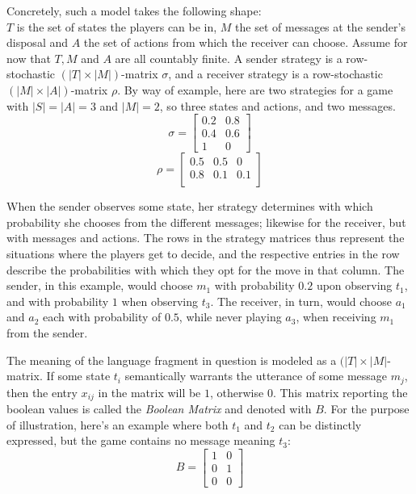 \documentclass[10]{article}
\begin{document}
Concretely, such a model takes the following shape:\\
$T$ is the set of states the players can be in, $M$ the set of messages at the sender's disposal and $A$ the set of actions from which the receiver can choose. Assume for now that $T,M$ and $A$ are all countably finite. A sender strategy is a row-stochastic $(|T| \times |M|)$-matrix $\sigma$, and a receiver strategy is a row-stochastic $(|M|\times |A|)$-matrix $\rho$. By way of example, here are two strategies for a game with $|S|=|A|=3$ and $|M|=2$, so three states and actions, and two messages. \\
\begin{equation*}
\sigma =
\begin{bmatrix}
0.2 & 0.8 \\
0.4 & 0.6 \\
1 & 0
\end{bmatrix}
\end{equation*}
\begin{equation*}
\rho =
\begin{bmatrix}
0.5 & 0.5 & 0\\
0.8 & 0.1 & 0.1 \\
\end{bmatrix}
\end{equation*}%

When the sender observes some state, her strategy determines with which probability she chooses from the different messages; likewise for the receiver, but with messages and actions. The rows in the strategy matrices thus represent the situations where the players get to decide, and the respective entries in the row describe the probabilities with which they opt for the move in that column. The sender, in this example, would choose $m_1$ with probability $0.2$ upon observing $t_1$, and with probability $1$ when observing $t_3$. The receiver, in turn, would choose $a_1$ and $a_2$ each with probability of $0.5$, while never playing $a_3$, when receiving $m_1$ from the sender.

The meaning of the language fragment in question is modeled as a $(|T| \times |M|$-matrix. If some state $t_i$ semantically warrants the utterance of some message $m_j$, then the entry $x_{ij}$ in the matrix will be $1$, otherwise $0$. This matrix reporting the boolean values is called the \textit{Boolean Matrix} and denoted with $B$. For the purpose of illustration, here's an example where both $t_1$ and $t_2$ can be distinctly expressed, but the game contains no message meaning $t_3$:\\
\begin{equation*}
B =
\begin{bmatrix}
1 & 0\\
0 & 1\\
0 & 0
\end{bmatrix}
\end{equation*}
\end{document}
